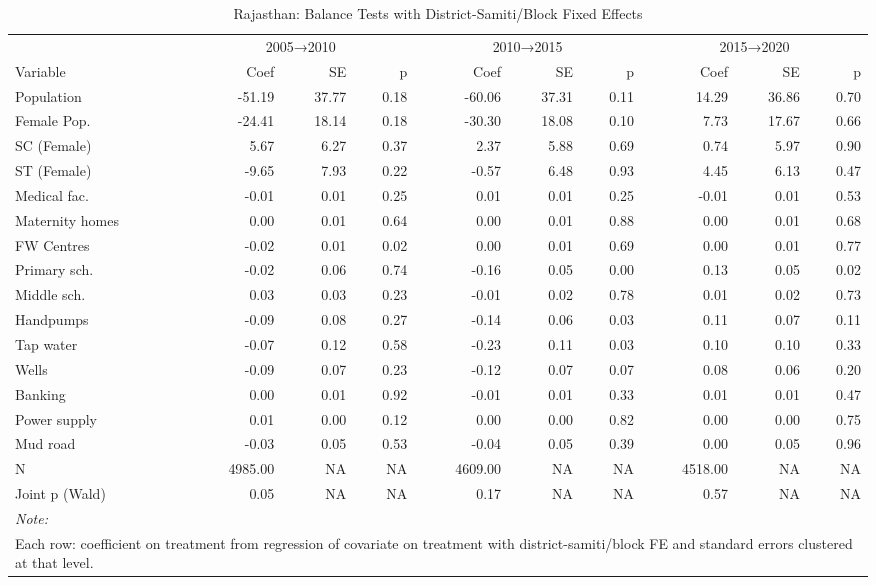 \begin{table}
\centering
\caption{\label{tab:balance_fe_raj}Rajasthan: Balance Tests with District-Samiti/Block Fixed Effects}
\centering
\fontsize{8}{10}\selectfont
\begin{tabular}[t]{lrrrrrrrrr}
\toprule
\multicolumn{1}{c}{ } & \multicolumn{3}{c}{2005→2010} & \multicolumn{3}{c}{2010→2015} & \multicolumn{3}{c}{2015→2020} \\
\cmidrule(l{3pt}r{3pt}){2-4} \cmidrule(l{3pt}r{3pt}){5-7} \cmidrule(l{3pt}r{3pt}){8-10}
Variable & Coef & SE & p & Coef & SE & p & Coef & SE & p\\
\midrule
Population & -51.19 & 37.77 & 0.18 & -60.06 & 37.31 & 0.11 & 14.29 & 36.86 & 0.70\\
Female Pop. & -24.41 & 18.14 & 0.18 & -30.30 & 18.08 & 0.10 & 7.73 & 17.67 & 0.66\\
SC (Female) & 5.67 & 6.27 & 0.37 & 2.37 & 5.88 & 0.69 & 0.74 & 5.97 & 0.90\\
ST (Female) & -9.65 & 7.93 & 0.22 & -0.57 & 6.48 & 0.93 & 4.45 & 6.13 & 0.47\\
Medical fac. & -0.01 & 0.01 & 0.25 & 0.01 & 0.01 & 0.25 & -0.01 & 0.01 & 0.53\\
\addlinespace
Maternity homes & 0.00 & 0.01 & 0.64 & 0.00 & 0.01 & 0.88 & 0.00 & 0.01 & 0.68\\
FW Centres & -0.02 & 0.01 & 0.02 & 0.00 & 0.01 & 0.69 & 0.00 & 0.01 & 0.77\\
Primary sch. & -0.02 & 0.06 & 0.74 & -0.16 & 0.05 & 0.00 & 0.13 & 0.05 & 0.02\\
Middle sch. & 0.03 & 0.03 & 0.23 & -0.01 & 0.02 & 0.78 & 0.01 & 0.02 & 0.73\\
Handpumps & -0.09 & 0.08 & 0.27 & -0.14 & 0.06 & 0.03 & 0.11 & 0.07 & 0.11\\
\addlinespace
Tap water & -0.07 & 0.12 & 0.58 & -0.23 & 0.11 & 0.03 & 0.10 & 0.10 & 0.33\\
Wells & -0.09 & 0.07 & 0.23 & -0.12 & 0.07 & 0.07 & 0.08 & 0.06 & 0.20\\
Banking & 0.00 & 0.01 & 0.92 & -0.01 & 0.01 & 0.33 & 0.01 & 0.01 & 0.47\\
Power supply & 0.01 & 0.00 & 0.12 & 0.00 & 0.00 & 0.82 & 0.00 & 0.00 & 0.75\\
Mud road & -0.03 & 0.05 & 0.53 & -0.04 & 0.05 & 0.39 & 0.00 & 0.05 & 0.96\\
\addlinespace
N & 4985.00 & NA & NA & 4609.00 & NA & NA & 4518.00 & NA & NA\\
Joint p (Wald) & 0.05 & NA & NA & 0.17 & NA & NA & 0.57 & NA & NA\\
\bottomrule
\multicolumn{10}{l}{\rule{0pt}{1em}\textit{Note: }}\\
\multicolumn{10}{l}{\rule{0pt}{1em}Each row: coefficient on treatment from regression of covariate on treatment with district-samiti/block FE and standard errors clustered at that level.}\\
\end{tabular}
\end{table}
